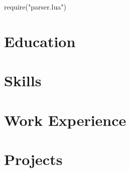 \documentclass[letterpaper,10pt]{article}
\begin{document}
\begin{luacode}
require("parser.lua")
\end{luacode}



\section{Education}
  \resumeSubHeadingListStart
  
  \resumeSubHeadingListEnd
  
\section{Skills}
  \resumeSubHeadingListStart 
  
  \resumeSubHeadingListEnd

\section{Work Experience}
  \resumeSubHeadingListStart
  	
  \resumeSubHeadingListEnd

\section{{Projects}}
  \resumeSubHeadingListStart
    
  \resumeSubHeadingListEnd

\end{document}
